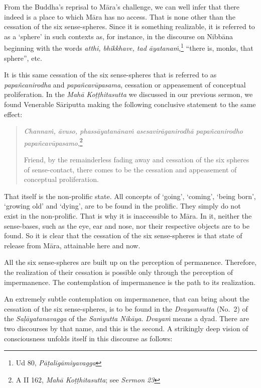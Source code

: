 From the Buddha's reprisal to Māra's challenge, we can well infer that there indeed is a place to which Māra has no access. That is none other than the cessation of the six sense-spheres. Since it is something realizable, it is referred to as a `sphere' in such contexts as, for instance, in the discourse on Nibbāna beginning with the words \emph{atthi, bhikkhave, tad āyatanaṁ},\footnote{Ud 80, \emph{Pāṭaligāmiyavagga}} ``there is, monks, that sphere'', etc.

It is this same cessation of the six sense-spheres that is referred to as \emph{papañcanirodha} and \emph{papañcavūpasama}, cessation or appeasement of conceptual proliferation. In the \emph{Mahā Koṭṭhitasutta} we discussed in our previous sermon, we found Venerable Sāriputta making the following conclusive statement to the same effect:

\begin{quote}
\emph{Channaṁ, āvuso, phassāyatanānaṁ asesavirāganirodhā papañcanirodho papañcavūpasamo},\footnote{A II 162, \emph{Mahā Koṭṭhitasutta}; see \emph{Sermon 23}}

Friend, by the remainderless fading away and cessation of the six spheres of sense-contact, there comes to be the cessation and appeasement of conceptual proliferation.
\end{quote}

That itself is the non-prolific state. All concepts of `going', `coming', `being born', `growing old' and `dying', are to be found in the prolific. They simply do not exist in the non-prolific. That is why it is inaccessible to Māra. In it, neither the sense-bases, such as the eye, ear and nose, nor their respective objects are to be found. So it is clear that the cessation of the six sense-spheres is that state of release from Māra, attainable here and now.

All the six sense-spheres are built up on the perception of permanence. Therefore, the realization of their cessation is possible only through the perception of impermanence. The contemplation of impermanence is the path to its realization.

An extremely subtle contemplation on impermanence, that can bring about the cessation of the six sense-spheres, is to be found in the \emph{Dvayamsutta} (No.~2) of the \emph{Saḷāyatanavagga} of the \emph{Saṁyutta Nikāya}. \emph{Dvayaṁ} means a dyad. There are two discourses by that name, and this is the second. A strikingly deep vision of consciousness unfolds itself in this discourse as follows:

